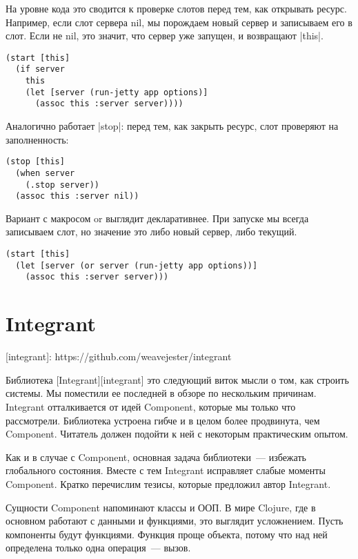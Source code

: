На уровне кода это сводится к проверке слотов перед тем, как открывать
ресурс. Например, если слот сервера nil, мы порождаем новый сервер и записываем
его в слот. Если не nil, это значит, что сервер уже запущен, и возвращают
\spverb|this|.

\begin{verbatim}
(start [this]
  (if server
    this
    (let [server (run-jetty app options)]
      (assoc this :server server))))
\end{verbatim}

Аналогично работает \spverb|stop|: перед тем, как закрыть ресурс, слот проверяют на
заполненность:

\begin{verbatim}
(stop [this]
  (when server
    (.stop server))
  (assoc this :server nil))
\end{verbatim}

Вариант с макросом or выглядит декларативнее. При запуске мы всегда записываем
слот, но значение это либо новый сервер, либо текущий.

\begin{verbatim}
(start [this]
  (let [server (or server (run-jetty app options))]
    (assoc this :server server)))
\end{verbatim}

\section{Integrant}

[integrant]: https://github.com/weavejester/integrant

Библиотека [Integrant][integrant] это следующий виток мысли о том, как строить
системы. Мы поместили ее последней в обзоре по нескольким причинам. Integrant
отталкивается от идей Component, которые мы только что рассмотрели. Библиотека
устроена гибче и в целом более продвинута, чем Component. Читатель должен
подойти к ней с некоторым практическим опытом.

Как и в случае с Component, основная задача библиотеки~--- избежать глобального
состояния. Вместе с тем Integrant исправляет слабые моменты Component. Кратко
перечислим тезисы, которые предложил автор Integrant.

Сущности Component напоминают классы и ООП. В мире Clojure, где в основном
работают с данными и функциями, это выглядит усложнением. Пусть компоненты будут
функциями. Функция проще объекта, потому что над ней определена только одна
операция~--- вызов.

